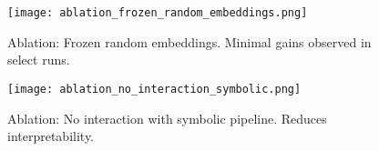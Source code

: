 \documentclass{article}
\begin{document}
\begin{figure}[ht]
\centering
\texttt{[image: ablation\_frozen\_random\_embeddings.png]}
\caption{Ablation: Frozen random embeddings. Minimal gains observed in select runs.}
\end{figure}

\begin{figure}[ht]
\centering
\texttt{[image: ablation\_no\_interaction\_symbolic.png]}
\caption{Ablation: No interaction with symbolic pipeline. Reduces interpretability.}
\end{figure}



\end{document}
